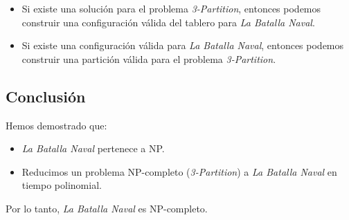 \begin{itemize}
    \item Si existe una solución para el problema \textit{3-Partition}, entonces podemos construir una configuración válida del tablero para \textit{La Batalla Naval}.
    \item Si existe una configuración válida para \textit{La Batalla Naval}, entonces podemos construir una partición válida para el problema \textit{3-Partition}.
\end{itemize}

\subsection*{Conclusión}

Hemos demostrado que:
\begin{itemize}
    \item \textit{La Batalla Naval} pertenece a NP.
    \item Reducimos un problema NP-completo (\textit{3-Partition}) a \textit{La Batalla Naval} en tiempo polinomial.
\end{itemize}

Por lo tanto, \textit{La Batalla Naval} es NP-completo.
